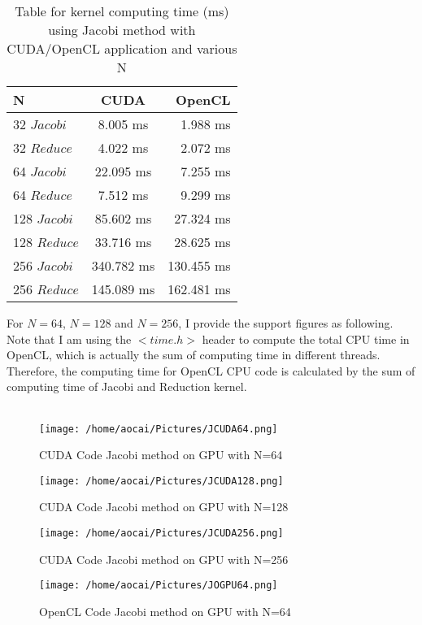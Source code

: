 \documentclass[12pt]{article}
\begin{document}
\begin{table}[H]
	\centering
	\label{tab:cg}
	\begin{tabular}{lcr}
	\bfseries N & CUDA & OpenCL\\ \hline
	32 $Jacobi$ & 8.005 ms & 1.988 ms\\
	32 $Reduce$ & 4.022 ms & 2.072 ms\\
	64 $Jacobi$ & 22.095 ms & 7.255 ms\\
	64 $Reduce$ & 7.512 ms & 9.299 ms\\
	128 $Jacobi$ & 85.602 ms & 27.324 ms\\
	128 $Reduce$ & 33.716 ms & 28.625 ms\\
	256 $Jacobi$ & 340.782 ms & 130.455 ms\\
	256 $Reduce$ & 145.089 ms & 162.481 ms\\
	\end{tabular}
	\caption[This is optional caption, without reference]{Table for kernel computing time (ms) using Jacobi method with CUDA/OpenCL application and various N}
\end{table}
For $N=64$, $N = 128$ and $N = 256$, I provide the support figures as following. Note that I am using the $<time.h>$ header to compute the total CPU time in OpenCL, which is actually the sum of computing time in different threads. Therefore, the computing time for OpenCL CPU code is calculated by the sum of computing time of Jacobi and Reduction kernel.\\\\
\begin{figure}[H]
	\centering
	\texttt{[image: /home/aocai/Pictures/JCUDA64.png]}
	\caption[Optional caption]{CUDA Code Jacobi method on GPU with N=64}
	\label{fig:JCUDA64}
\end{figure}
\begin{figure}[H]
	\centering
	\texttt{[image: /home/aocai/Pictures/JCUDA128.png]}
	\caption[Optional caption]{CUDA Code Jacobi method on GPU with N=128}
	\label{fig:JCUDA128}
\end{figure}
\begin{figure}[H]
	\centering
	\texttt{[image: /home/aocai/Pictures/JCUDA256.png]}
	\caption[Optional caption]{CUDA Code Jacobi method on GPU with N=256}
	\label{fig:JCUDA256}
\end{figure}
\begin{figure}[H]
	\centering
	\texttt{[image: /home/aocai/Pictures/JOGPU64.png]}
	\caption[Optional caption]{OpenCL Code Jacobi method on GPU with N=64}
	\label{fig:JOGPU64}
\end{figure}
\end{document}
